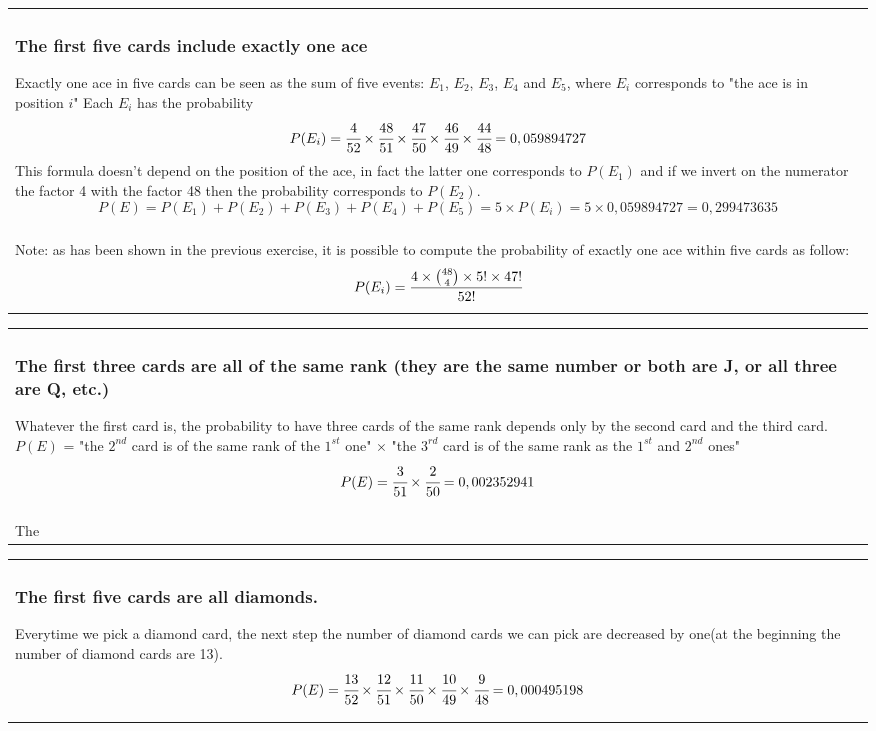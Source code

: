 \documentclass[oneside]{article}			%
\newenvironment{adjustwidth}{\begin{center}\begin{tabular}{p{0.9\textwidth}}   }{\end{tabular} \end{center}}		%
\begin{document}
	\begin{adjustwidth}
	\subsubsection{The first five cards include exactly one ace}
	Exactly one ace in five cards can be seen as the sum of five events: $E_1$, $E_2$, $E_3$, $E_4$ and $E_5$, where $E_i$ corresponds to "the ace is in position $i$"
	\newline Each $E_i$ has the probability \[P(E_i) = \cfrac{4}{52} \times \cfrac{48}{51} \times \cfrac{47}{50} \times \cfrac{46}{49} \times \cfrac{44}{48} = 0,059894727 \]
	\newline This formula doesn't depend on the position of the ace, in fact the latter one corresponds to $P(E_1)$ and if we invert on the numerator the factor 4 with the factor 48 then the probability corresponds to $P(E_2)$.
	\[P(E) = P(E_1) + P(E_2) + P(E_3) + P(E_4) + P(E_5) = 5 \times P(E_i) = 5 \times 0,059894727 = 0,299473635 \]
	\\\\
	Note: as has been shown in the previous exercise, it is possible to compute the probability of exactly one ace within five cards as follow:
	\[P(E_i) = \cfrac{4 \times \binom{48}{4} \times 5! \times 47!}{52!}   \]
	\end{adjustwidth}

	\begin{adjustwidth}
	\subsubsection{The first three cards are all of the same rank (they are the same number or both are J, or all three are Q, etc.)}
	Whatever the first card is, the probability to have three cards of the same rank depends only by the second card and the third card.
	\newline $P(E)$ = "the $2^{nd}$ card is of the same rank of the $1^{st}$ one" $\times$ "the $3^{rd}$ card is of the same rank as the $1^{st}$ and $2^{nd}$ ones"
	\[P(E) = \cfrac{3}{51} \times \cfrac{2}{50} = 0,002352941 \]
	\\\\
	The
	\end{adjustwidth}

	\begin{adjustwidth}
	\subsubsection{The first five cards are all diamonds.}
	Everytime we pick a diamond card, the next step the number of diamond cards we can pick are decreased by one(at the beginning the number of diamond cards are 13).
	\[P(E) = \cfrac{13}{52} \times \cfrac{12}{51} \times \cfrac{11}{50} \times \cfrac{10}{49} \times \cfrac{9}{48} = 0,000495198\]
	\end{adjustwidth}
\end{document}
